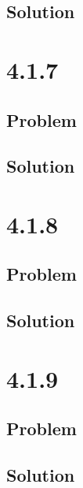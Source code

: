 \documentclass[12pt]{article}
\begin{document}
\subsection{Solution}

\section{4.1.7}

\subsection{Problem}

\subsection{Solution}

\section{4.1.8}

\subsection{Problem}

\subsection{Solution}

\section{4.1.9}

\subsection{Problem}

\subsection{Solution}



\nocite{arfken2013mathematical}
\nocite{El-Deeb_PEU-356_Assignments}
\end{document}
